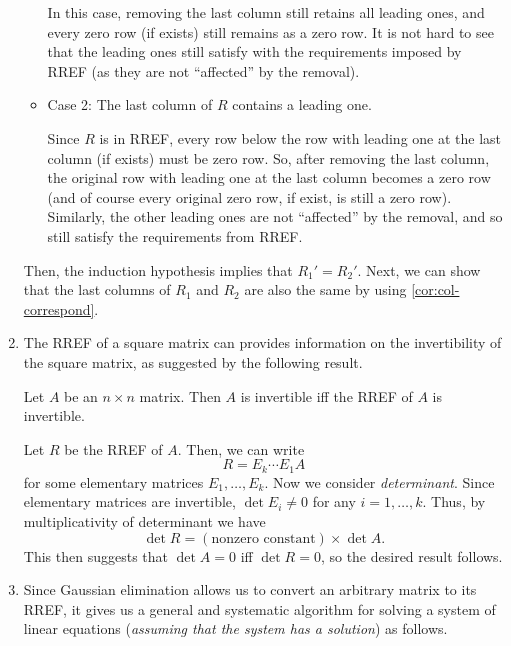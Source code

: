 \begin{enumerate}
\begin{pf}
\begin{pf}
\begin{itemize}
In this case, removing the last column still retains all leading ones, and
every zero row (if exists) still remains as a zero row. It is not hard to see
that the leading ones still satisfy with the requirements imposed by RREF (as
they are not ``affected'' by the removal).

\item Case 2: The last column of \(R\) contains a leading one.

Since \(R\) is in RREF, every row below the row with leading one at the last
column (if exists) must be zero row. So, after removing the last column, the
original row with leading one at the last column becomes a zero row (and of
course every original zero row, if exist, is still a zero row). Similarly, the
other leading ones are not ``affected'' by the removal, and so still satisfy
the requirements from RREF.
\end{itemize}
\end{pf}

Then, the induction hypothesis implies that \(R_1'=R_2'\). Next, we can show
that the last columns of \(R_1\) and \(R_2\) are also the same by using
\cref{cor:col-correspond}.
\end{pf}

\item The RREF of a square matrix can provides information on the invertibility
of the square matrix, as suggested by the following result.

\begin{proposition}
\label{prp:matx-inv-iff-rref-inv}
Let \(A\) be an \(n\times n\) matrix. Then \(A\) is invertible iff the RREF of
\(A\) is invertible.
\end{proposition}
\begin{pf}
Let \(R\) be the RREF of \(A\). Then, we can write
\[
R=E_k\dotsb E_1A
\]
for some elementary matrices \(E_1,\dotsc,E_k\). Now we consider
\emph{determinant}. Since elementary matrices are invertible, \(\det E_i\ne 0\)
for any \(i=1,\dotsc,k\). Thus, by multiplicativity of determinant we have
\[
\det R=(\text{nonzero constant})\times \det A.
\]
This then suggests that \(\det A=0\) iff \(\det R=0\), so the desired result
follows.
\end{pf}

\item \label{it:solve-sle-algo} Since Gaussian elimination allows us to convert
an arbitrary matrix to its RREF, it gives us a general and systematic algorithm
for solving a system of linear equations (\emph{assuming that the system has a
solution}) as follows.


\end{enumerate}

